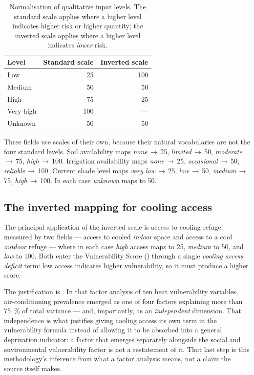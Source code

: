 \begin{table}[H]
\centering
\caption[Qualitative level normalisation]{Normalisation of qualitative input
levels. The standard scale applies where a higher level indicates higher risk
or higher quantity; the inverted scale applies where a higher level indicates
\emph{lower} risk.}
\label{tab:levels}
\small
\begin{tabular}{@{}lrr@{}}
\toprule
\textbf{Level} & \textbf{Standard scale} & \textbf{Inverted scale} \\
\midrule
Low        & 25  & 100 \\
Medium     & 50  & 50  \\
High       & 75  & 25  \\
Very high  & 100 & --- \\
Unknown    & 50  & 50  \\
\bottomrule
\end{tabular}
\end{table}

Three fields use scales of their own, because their natural vocabularies are
not the four standard levels. Soil availability maps
\emph{none}\,$\rightarrow$\,25, \emph{limited}\,$\rightarrow$\,50,
\emph{moderate}\,$\rightarrow$\,75, \emph{high}\,$\rightarrow$\,100. Irrigation
availability maps \emph{none}\,$\rightarrow$\,25,
\emph{occasional}\,$\rightarrow$\,50, \emph{reliable}\,$\rightarrow$\,100.
Current shade level maps \emph{very low}\,$\rightarrow$\,25,
\emph{low}\,$\rightarrow$\,50, \emph{medium}\,$\rightarrow$\,75,
\emph{high}\,$\rightarrow$\,100. In each case \emph{unknown} maps to 50.

\subsection{The inverted mapping for cooling access}
\label{sec:inverted}

The principal application of the inverted scale is access to cooling refuge,
measured by two fields --- access to cooled \emph{indoor} space and access to a
cool \emph{outdoor} refuge --- where in each case \emph{high} access maps to
25, \emph{medium} to 50, and \emph{low} to 100. Both enter the Vulnerability
Score () through a single \emph{cooling access
deficit} term: low access indicates higher vulnerability, so it must produce a
higher score.

The justification is \textcite{reid2009}. In that factor analysis of ten heat
vulnerability variables, air-conditioning prevalence emerged as one of four
factors explaining more than \SI{75}{\percent} of total variance --- and,
importantly, as an \emph{independent} dimension. That independence is what
justifies giving cooling access its own term in the vulnerability formula
instead of allowing it to be absorbed into a general deprivation indicator: a
factor that emerges separately alongside the social and environmental
vulnerability factor is not a restatement of it. That last step is this
methodology's inference from what a factor analysis means, not a claim the
source itself makes.

